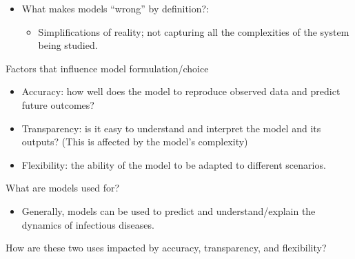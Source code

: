 \documentclass[
  ignorenonframetext,
]{beamer}
\providecommand{\tightlist}{%
  \setlength{\itemsep}{0pt}\setlength{\parskip}{0pt}}\usepackage{longtable,booktabs,array}
\begin{document}
\begin{frame}
\begin{itemize}
\tightlist
\item
  What makes models ``wrong'' by definition?:

  \begin{itemize}
  \tightlist
  \item
    Simplifications of reality; not capturing all the complexities of
    the system being studied.
  \end{itemize}
\end{itemize}
\end{frame}

\begin{frame}
\begin{block}{Factors that influence model formulation/choice}
\label{factors-that-influence-model-formulationchoice}
\begin{itemize}
\tightlist
\item
  {Accuracy}: how well does the model to reproduce observed data and
  predict future outcomes?
\item
  {Transparency}: is it easy to understand and interpret the model and
  its outputs? (This is affected by the model's complexity)
\item
  {Flexibility}: the ability of the model to be adapted to different
  scenarios.
\end{itemize}

\end{block}
\end{frame}

\begin{frame}
\begin{block}{What are models used for?}
\label{what-are-models-used-for}
\begin{itemize}
\tightlist
\item
  Generally, models can be used to predict and understand/explain the
  dynamics of infectious diseases.
\end{itemize}

\begin{tcolorbox}[enhanced jigsaw, colframe=quarto-callout-caution-color-frame, toprule=.15mm, opacitybacktitle=0.6, breakable, colback=white, leftrule=.75mm, left=2mm, opacityback=0, titlerule=0mm, bottomtitle=1mm, toptitle=1mm, title={Discussion}, bottomrule=.15mm, arc=.35mm, coltitle=black, colbacktitle=quarto-callout-caution-color!10!white, rightrule=.15mm]

How are these two uses impacted by accuracy, transparency, and
flexibility?

\end{tcolorbox}
\end{block}
\end{frame}
\end{document}
